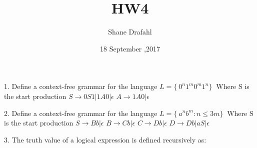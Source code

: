 \documentclass[11pt]{article}
\title{HW4}
\author{Shane Drafahl}
\date{18 September ,2017}
\begin{document}
    \maketitle

    1. Define a context-free grammar for the language $ L = \{\ 0^{n} 1^{m} 0^{m} 1^{n} \}\ $
    Where S is the start production
    $ S \rightarrow 0S1 | 1A0 | \epsilon $
    $ A \rightarrow 1A0 | \epsilon $

    2. Define a context-free grammar for the language $ L = \{\ a^{n}b^{m} : n \leq 3m \}\ $
    Where S is the start production
    $ S \rightarrow Bb | \epsilon $
    $ B \rightarrow Cb | \epsilon $
    $ C \rightarrow Db | \epsilon $
    $ D \rightarrow Db | aS | \epsilon $

    3. The truth value of a logical expression is defined recursively as:

    
    


    
\end{document}
